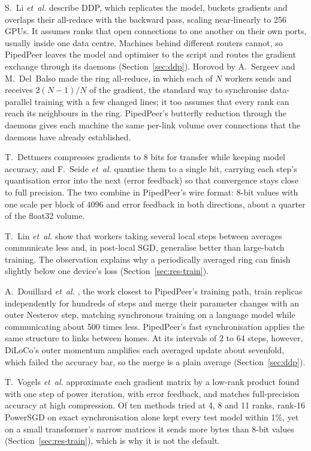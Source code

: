 S.~Li \textit{et~al.} \cite{li2020pytorchddp} describe DDP, which
replicates the model, buckets gradients and overlaps their all-reduce with the
backward pass, scaling near-linearly to 256 GPUs. It assumes ranks that open
connections to one another on their own ports, usually inside one data centre.
Machines behind different routers cannot, so PipedPeer leaves the model and
optimiser to the script and routes the gradient exchange through its daemons
(Section~\ref{sec:ddp}). Horovod \cite{sergeev2018horovod} by A.~Sergeev and
M.~Del~Balso made the ring all-reduce, in which each of $N$ workers sends and
receives $2(N-1)/N$ of the gradient, the standard way to synchronise data-parallel
training with a few changed lines; it too assumes that every rank can reach its
neighbours in the ring. PipedPeer's butterfly reduction through the daemons
gives each machine the same per-link volume over connections that the daemons
have already established.

T.~Dettmers \cite{dettmers2016eightbit} compresses gradients to 8 bits for
transfer while keeping model accuracy, and F.~Seide \textit{et~al.} \cite{seide2014onebit} quantise them to a
single bit, carrying each step's quantisation error into the next (error
feedback) so that convergence stays close to full precision. The two combine in
PipedPeer's wire format: 8-bit values with one scale per block of 4096 and error
feedback in both directions, about a quarter of the float32 volume.

T.~Lin \textit{et~al.} \cite{lin2020localsgd} show that workers taking several local steps between
averages communicate less and, in post-local SGD, generalise better than
large-batch training. The observation explains why a periodically averaged ring
can finish slightly below one device's loss (Section~\ref{sec:res-train}).

A.~Douillard \textit{et~al.} \cite{douillard2023diloco}, the work closest to
PipedPeer's training path, train replicas independently for hundreds of steps
and merge their parameter changes with an outer Nesterov step, matching
synchronous training on a language model while communicating about 500 times
less. PipedPeer's fast synchronisation applies the same structure to links
between homes. At its intervals of 2 to 64 steps, however, DiLoCo's outer
momentum amplifies each averaged update about sevenfold, which failed the
accuracy bar, so the merge is a plain average (Section~\ref{sec:ddp}).

T.~Vogels \textit{et~al.} \cite{vogels2019powersgd} approximate each gradient matrix by a low-rank product found with one step of
power iteration, with error feedback, and matches full-precision accuracy at
high compression. Of ten methods tried at 4, 8 and 11 ranks, rank-16
PowerSGD on exact synchronisation alone kept every test model within 1\%, yet
on a small transformer's narrow matrices it sends more bytes than 8-bit values
(Section~\ref{sec:res-train}), which is why it is not the default.


